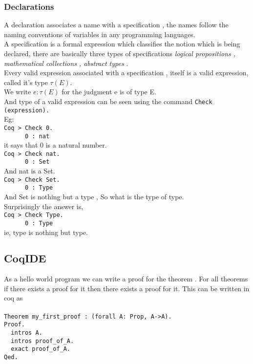 \documentclass[twocolumn]{book}
\begin{document}
\subsubsection{Declarations}
A declaration associates a name with a specification , the names follow the naming conventions of variables in any programming languages.\\
A specification is a formal expression which classifies the notion which is being declared, there are basically three types of specifications \textit{logical propositions , mathematical collections , abstract types } . \\
Every valid expression associated with a specification , itself is a valid expression, called it's type $ \tau \left(E \right) $.\\
We write $ e : \tau \left( E \right) $ for the judgment e is of type E. \\
And type of a valid expression can be seen using the command \verb|Check (expression).|\\
Eg:\\
\verb|Coq > Check 0. |\\
\verb|      0 : nat|\\
it says that 0 is a natural number.\\

\verb|Coq > Check nat. |\\
\verb|      0 : Set|\\
And nat is a Set.\\

\verb|Coq > Check Set. |\\
\verb|      0 : Type|\\
And Set is nothing but a type , So what is the type of type.\\

Surprisingly the answer is,\\

\verb|Coq > Check Type. |\\
\verb|      0 : Type|\\

ie,  type is nothing but type.

\subsection{CoqIDE}
As a hello world program we can write a proof for the theorem . For all theorems if there exists a proof for it then there exists a proof for it. This can be written in coq as\\ \\
\verb|Theorem my_first_proof : (forall A: Prop, A->A).|\\
\verb|Proof.|\\
\verb|	intros A.|\\
\verb|	intros proof_of_A.|\\
\verb|	exact proof_of_A.|\\
\verb|Qed.|\\
\end{document}
